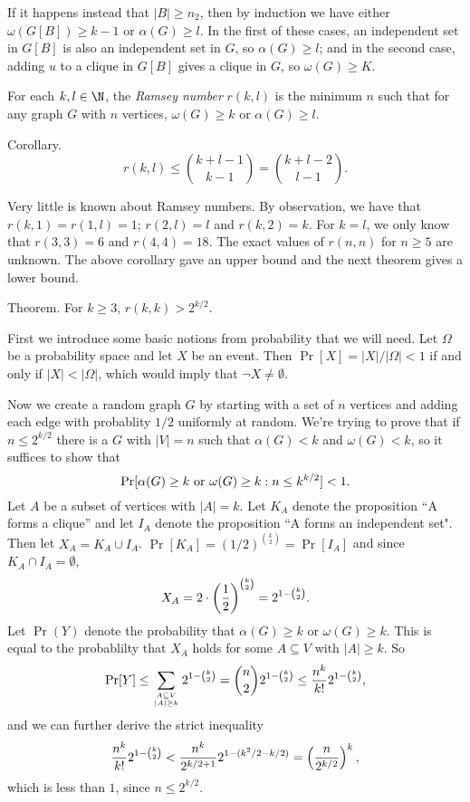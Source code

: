 If it happens instead that $|B|\geq n_2$, then by induction we have either $\omega(G[B]) \geq k-1$ or $\alpha(G)\geq l$. In the first of these cases, an independent set in $G[B]$ is also an independent set in $G$, so $\alpha(G)\geq l$; and in the second case, adding $u$ to a clique in $G[B]$ gives a clique in $G$, so $\omega(G) \geq K$. \slug

For each $k,l\in \N$, the {\it Ramsey number} $r(k,l)$ is the minimum $n$ such that for any graph $G$ with $n$ vertices, $\omega(G)\geq k$ or $\alpha(G)\geq l$.

\proclaim Corollary. $$r(k,l) \leq {k+l-1\choose k-1} = {k+l-2\choose l-1}.$$

Very little is known about Ramsey numbers. By observation, we have that $r(k,1) = r(1,l) = 1$; $r(2,l) = l$ and $r(k,2) = k$. For $k=l$, we only know that $r(3,3) = 6$ and $r(4,4) = 18$. The exact values of $r(n,n)$ for $n\geq 5$ are unknown. The above corollary gave an upper bound and the next theorem gives a lower bound.

\proclaim Theorem. For $k\geq 3$, $r(k,k)>2^{k/2}$.

\proof First we introduce some basic notions from probability that we will need. Let $\Omega$ be a probability space and let $X$ be an event. Then $\Pr[X] = |X|/|\Omega| < 1$ if and only if $|X| < |\Omega|$, which would imply that $\neg X \neq \emptyset$.

Now we create a random graph $G$ by starting with a set of $n$ vertices and adding each edge with probablity $1/2$ uniformly at random. We're trying to prove that if $n\leq 2^{k/2}$ there is a $G$ with $|V| = n$ such that $\alpha(G) < k$ and $\omega(G) < k$, so it suffices to show that
$$\Pr[\alpha(G) \geq k\ \hbox{or}\ \omega(G)\geq k : n\leq k^{k/2}] < 1.$$
Let $A$ be a subset of vertices with $|A|=k$. Let $K_A$ denote the proposition ``A forms a clique'' and let $I_A$ denote the proposition ``A forms an independent set". Then let $X_A = K_A \cup I_A$. $\Pr[K_A] = (1/2)^{k\choose 2} = \Pr[I_A]$ and since $K_A \cap I_A = \emptyset$,
$$X_A = 2\cdot\left({1\over 2}\right)^{k\choose 2} = 2^{1-{k\choose 2}}.$$
Let $\Pr(Y)$ denote the probability that $\alpha(G) \geq k$ or $\omega(G) \geq k$. This is equal to the probablilty that $X_A$ holds for some $A\subseteq V$ with $|A|\geq k$. So
$$\Pr[Y] \leq \sum_{A\subseteq V\atop |A|\geq k} 2^{1-{k\choose 2}} = {n\choose 2}2^{1-{k\choose 2}} \leq {n^k\over k!}2^{1-{k\choose 2}},$$
and we can further derive the strict inequality
$${n^k\over k!}2^{1-{k\choose 2}} < {n^k\over {2^{k/2+1}}}2^{1-(k^2/2-k/2)} = \left({n\over 2^{k/2}}\right)^k,$$
which is less than $1$, since $n\leq 2^{k/2}$. \slug

